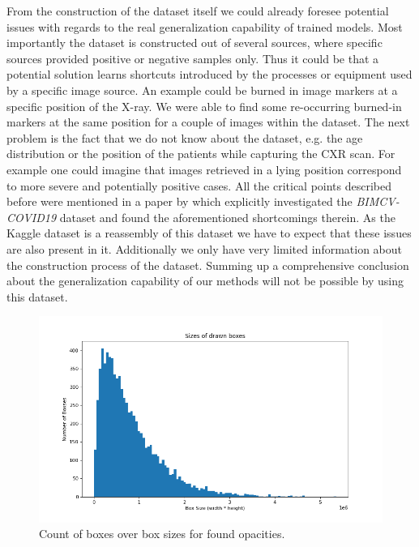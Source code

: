 From the construction of the dataset itself we could already foresee potential issues with regards to the real generalization capability of trained models. Most importantly the dataset is constructed out of several sources, where specific sources provided positive or negative samples only. Thus it could be that a potential solution learns shortcuts introduced by the processes or equipment used by a specific image source. An example could be burned in image markers at a specific position of the X-ray. We were able to find some re-occurring burned-in markers at the same position for a couple of images within the dataset. The next problem is the fact that we do not know about the dataset, e.g. the age distribution or the position of the patients while capturing the \ac{CXR} scan. For example one could imagine that images retrieved in a lying position correspond to more severe and potentially positive cases. All the critical points described before were mentioned in a paper by \citeauthor{degrave2021ai} \autocite{degrave2021ai} which explicitly investigated the \textit{BIMCV-COVID19} dataset and found the aforementioned shortcomings therein. As the Kaggle dataset is a reassembly of this dataset we have to expect that these issues are also present in it. Additionally we only have very limited information about the construction process of the dataset. Summing up a comprehensive conclusion about the generalization capability of our methods will not be possible by using this dataset.

\begin{figure}
	\centering
	\includegraphics[width=0.75\linewidth]{img/box_size_distribution.png}
	\caption{Count of boxes over box sizes for found opacities.}
	\label{fig:box-sizes}
\end{figure}

